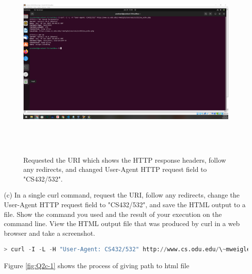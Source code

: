 \documentclass[12pt]{article}
\begin{document}
\begin{figure}[h!]
    \centering
    \includegraphics[trim=0 0 0 0, clip, width=\textwidth,height=10cm] {Q2b.png}
    \caption{Requested the URI which shows the HTTP response headers, follow any redirects, and changed User-Agent HTTP request field to "CS432/532".}
    \label{fig:Q2b}
\end{figure}


(c) In a single curl command, request the URI, follow any redirects, change the User-Agent HTTP request field to "CS432/532", and save the HTML output to a file. Show the command you used and the result of your execution on the command line. View the HTML output file that was produced by curl in a web browser and take a screenshot.

\begin{lstlisting}[language=Python, caption=Python example copied into the LaTeX, label=lst:copy]
> curl -I -L -H "User-Agent: CS432/532" http://www.cs.odu.edu/\~mweigle/courses/cs532/ua_echo.php --output index.html
\end{lstlisting}

Figure \ref{fig:Q2c-1} shows the process of giving path to html file
\end{document}
